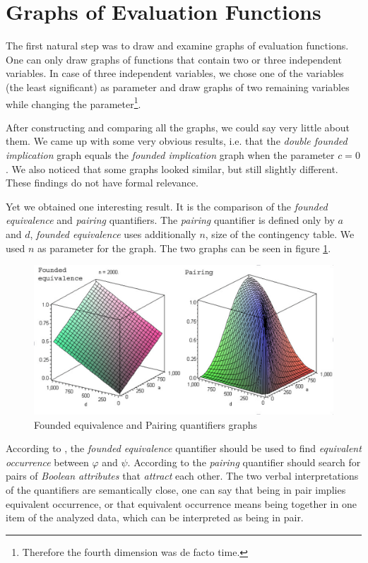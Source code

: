 \section{Graphs of Evaluation Functions} \label{Graphs}

The first natural step was to draw and examine graphs of evaluation functions. One can only draw graphs of functions that contain two or three independent variables. In case of three independent variables, we chose one of the variables (the least significant) as parameter and draw graphs of two remaining variables while changing the parameter\footnote{Therefore the fourth dimension was de facto time.}. 

After constructing and comparing all the graphs, we could say very little about them. We came up with some very obvious results, i.e. that the {\it double founded implication \/} graph equals the {\it founded implication \/} graph when the parameter $c=0$. We also noticed that some graphs looked similar, but still slightly different. These findings do not have formal relevance.

Yet we obtained one interesting result. It is the comparison of the {\it founded equivalence \/}
and {\it pairing \/} quantifiers. The {\it pairing \/} quantifier is defined only by $a$ and
$d$, {\it founded equivalence \/} uses additionally $n$, size of the contingency table. We used
$n$ as parameter for the graph. The two graphs can be seen in figure \ref{fig:FEPairing}.

\begin{figure}[ht]
\centering
\includegraphics[width=115mm]{FE-Pairing.eps}
\caption{Founded equivalence and Pairing quantifiers graphs}
\label{fig:FEPairing}
\end{figure}

According to \cite{RK:07,Kupka}, the {\it founded equivalence \/} quantifier should be used to find \emph{equivalent occurrence} between $\varphi$ and $\psi$. According to \cite{Kupka} the 
{\it pairing \/} quantifier should search for pairs of \emph{Boolean attributes} that \emph{attract} each other. The two verbal interpretations of the quantifiers are semantically close, one can say that being in pair implies equivalent occurrence, or that equivalent occurrence means being together in one item of the analyzed data, which can be interpreted as being in pair.

